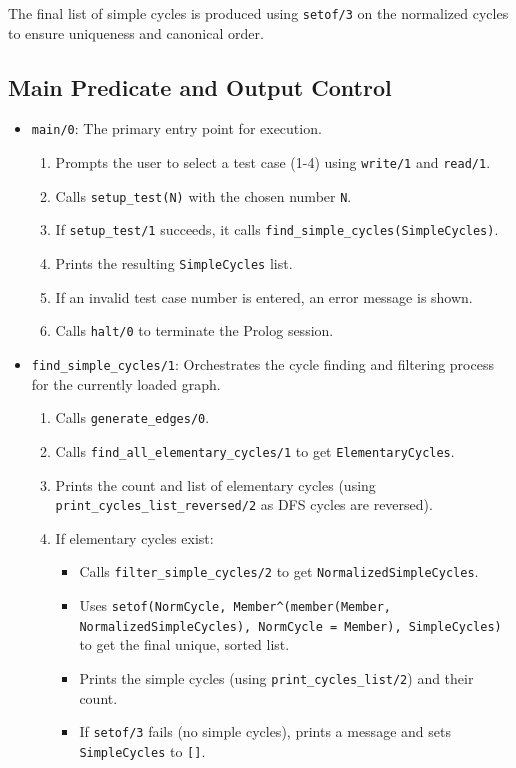 \documentclass[12pt,a4paper]{article}
\begin{document}
The final list of simple cycles is produced using \texttt{setof/3} on the normalized cycles to ensure uniqueness and canonical order.
\subsection{Main Predicate and Output Control}
\begin{itemize}
\item \texttt{main/0}: The primary entry point for execution.
\begin{enumerate}
\item Prompts the user to select a test case (1-4) using \texttt{write/1} and \texttt{read/1}.
\item Calls \texttt{setup\_test(N)} with the chosen number \texttt{N}.
\item If \texttt{setup\_test/1} succeeds, it calls \texttt{find\_simple\_cycles(SimpleCycles)}.
\item Prints the resulting \texttt{SimpleCycles} list.
\item If an invalid test case number is entered, an error message is shown.
\item Calls \texttt{halt/0} to terminate the Prolog session.
\end{enumerate}
\item \texttt{find\_simple\_cycles/1}: Orchestrates the cycle finding and filtering process for the currently loaded graph.
\begin{enumerate}
\item Calls \texttt{generate\_edges/0}.
\item Calls \texttt{find\_all\_elementary\_cycles/1} to get \texttt{ElementaryCycles}.
\item Prints the count and list of elementary cycles (using \texttt{print\_cycles\_list\_reversed/2} as DFS cycles are reversed).
\item If elementary cycles exist:
\begin{itemize}
\item Calls \texttt{filter\_simple\_cycles/2} to get \texttt{NormalizedSimpleCycles}.
\item Uses \texttt{setof(NormCycle, Member\textasciicircum{}(member(Member, NormalizedSimpleCycles), NormCycle = Member), SimpleCycles)} to get the final unique, sorted list.
\item Prints the simple cycles (using \texttt{print\_cycles\_list/2}) and their count.
\item If \texttt{setof/3} fails (no simple cycles), prints a message and sets \texttt{SimpleCycles} to \texttt{[]}.

\end{itemize}
\end{enumerate}
\end{itemize}
\end{document}
